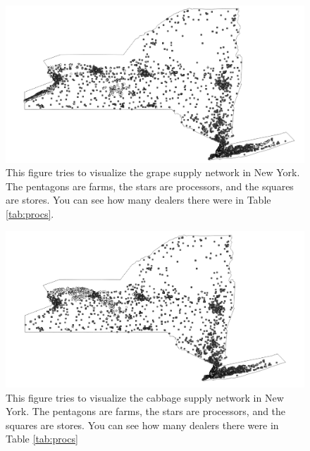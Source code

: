 \documentclass{report}
\begin{document}
\begin{figure}
\centering
\begin{framed}
\includegraphics[scale=.50]{network_69}
\caption{This figure tries to visualize the grape supply network in New York. The pentagons are farms, the stars are processors, and the squares are stores. You can see how many dealers there were in Table \ref{tab:procs}. }
\label{fig:network_69}
\end{framed}
\end{figure}

\begin{figure}
\centering
\begin{framed}
\includegraphics[scale=.50]{network_243}
\caption{This figure tries to visualize the cabbage supply network in New York. The pentagons are farms, the stars are processors, and the squares are stores. You can see how many dealers there were in Table \ref{tab:procs}}
\label{fig:network_243}
\end{framed}
\end{figure}

\end{document}
